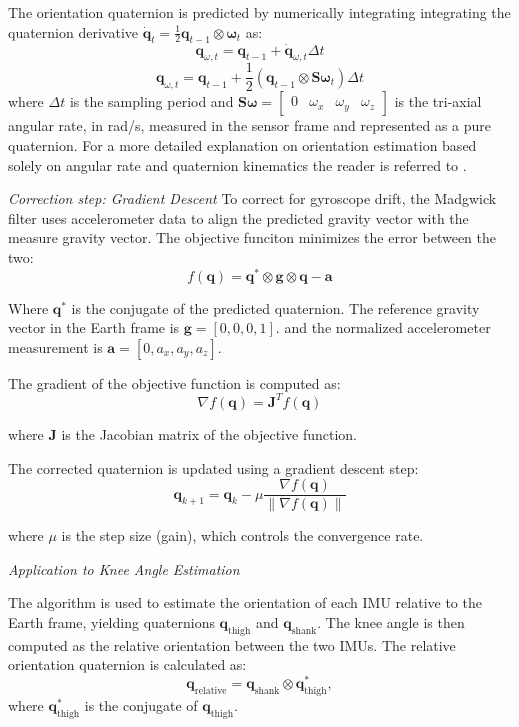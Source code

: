 The orientation quaternion is predicted by numerically integrating integrating the quaternion derivative 
\(
\dot{\mathbf{q}}_t = \frac{1}{2} \mathbf{q}_{t-1} \otimes \boldsymbol{\omega}_t
\) as:
\[
\mathbf{q}_{\omega, t} = \mathbf{q}_{t-1} + \dot{\mathbf{q}}_{\omega, t} \Delta t
\]
\[
\mathbf{q}_{\omega, t} = \mathbf{q}_{t-1} + \frac{1}{2} \left( \mathbf{q}_{t-1} \otimes \mathbf{S}\boldsymbol{\omega}_t \right) \Delta t
\]
where \( \Delta t \) is the sampling period and 
\(
\mathbf{S}\boldsymbol{\omega} = 
\begin{bmatrix}
0 & \omega_x & \omega_y & \omega_z
\end{bmatrix}
\)
is the tri-axial angular rate, in rad/s, measured in the sensor frame and represented as a pure quaternion. For a more detailed explanation on orientation estimation based solely on angular rate and quaternion kinematics the reader is referred to \cite{sola_quaternion_2017}.

\textit{Correction step: Gradient Descent}
To correct for gyroscope drift, the Madgwick filter uses accelerometer data to align the predicted gravity vector with the measure gravity vector. The objective funciton minimizes the error between the two:
\[
f(\mathbf{q}) = \mathbf{q}^* \otimes \mathbf{g} \otimes \mathbf{q} - \mathbf{a}
\]

Where  \( \mathbf{q}^* \) is the conjugate of the predicted quaternion. The reference gravity vector in the Earth frame is \(\mathbf{g} = [0, 0, 0, 1].\) and the normalized accelerometer measurement is
    \(
    \mathbf{a} = [0, a_x, a_y, a_z].
    \)

The gradient of the objective function is computed as:
\[
\nabla f(\mathbf{q}) = \mathbf{J}^T f(\mathbf{q})
\]

where \( \mathbf{J} \) is the Jacobian matrix of the objective function.

The corrected quaternion is updated using a gradient descent step:
\[
\mathbf{q}_{k+1} = \mathbf{q}_k - \mu \frac{\nabla f(\mathbf{q})}{\|\nabla f(\mathbf{q})\|}
\]

where \( \mu \) is the step size (gain), which controls the convergence rate.


\textit{Application to Knee Angle Estimation}

 The algorithm is used to estimate the orientation of each IMU relative to the Earth frame, yielding quaternions \( \mathbf{q}_{\text{thigh}} \) and \( \mathbf{q}_{\text{shank}} \). The knee angle is then computed as the relative orientation between the two IMUs.
The relative orientation quaternion is calculated as:
\[
\mathbf{q}_{\text{relative}} = \mathbf{q}_{\text{shank}} \otimes \mathbf{q}_{\text{thigh}}^*,
\]
where \( \mathbf{q}_{\text{thigh}}^* \) is the conjugate of \( \mathbf{q}_{\text{thigh}} \).

